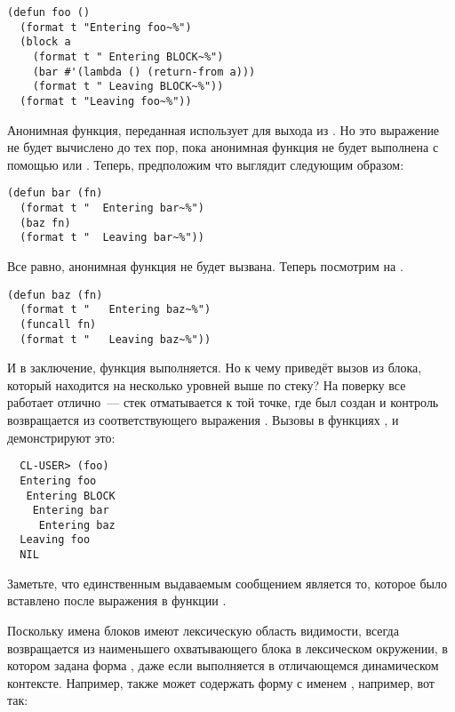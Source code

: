 \begin{lstlisting}
(defun foo ()
  (format t "Entering foo~%")
  (block a
    (format t " Entering BLOCK~%")
    (bar #'(lambda () (return-from a)))
    (format t " Leaving BLOCK~%"))
  (format t "Leaving foo~%"))
\end{lstlisting}

Анонимная функция, переданная  использует  для выхода из
. Но это выражение  не будет вычислено до тех пор, пока
анонимная функция не будет выполнена с помощью  или . Теперь,
предположим что  выглядит следующим образом:

\begin{lstlisting}
(defun bar (fn)
  (format t "  Entering bar~%")
  (baz fn)
  (format t "  Leaving bar~%"))
\end{lstlisting}

Все равно, анонимная функция не будет вызвана. Теперь посмотрим на .

\begin{lstlisting}
(defun baz (fn)
  (format t "   Entering baz~%")
  (funcall fn)
  (format t "   Leaving baz~%"))
\end{lstlisting}

И в заключение, функция выполняется. Но к чему приведёт вызов  из блока,
который находится на несколько уровней выше по стеку? На поверку все работает отлично~---
стек отматывается к той точке, где  был создан и контроль возвращается из
соответствующего выражения . Вызовы  в функциях ,
 и  демонстрируют это:

\begin{verbatim}
  CL-USER> (foo)
  Entering foo
   Entering BLOCK
    Entering bar
     Entering baz
  Leaving foo
  NIL
\end{verbatim}

Заметьте, что единственным выдаваемым сообщением  является то, которое
было вставлено после выражения  в функции .

Поскольку имена блоков имеют лексическую область видимости,  всегда
возвращается из наименьшего охватывающего блока  в лексическом окружении, в
котором задана форма , даже если  выполняется в
отличающемся динамическом контексте. Например,  также может содержать форму
 с именем , например, вот так:

